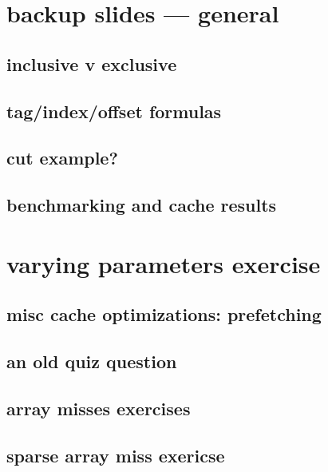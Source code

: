 
\section{backup slides --- general}



\subsection{inclusive v exclusive}


\subsection{tag/index/offset formulas}


\subsection{cut example?}


\subsection{benchmarking and cache results}



\section{varying parameters exercise}


\subsection{misc cache optimizations: prefetching}


\subsection{an old quiz question}


\subsection{array misses exercises}

\subsection{sparse array miss exericse}


